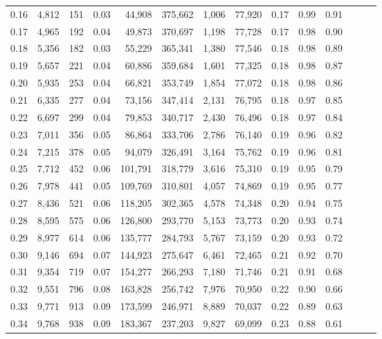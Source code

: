 \begin{tabular}{rrrrrrrrrrrrrr}
0.16 &  4,812 &    151 &  0.03 &   44,908 &  375,662 &   1,006 &  77,920 &  0.17 &  0.99 &      0.91 \\
0.17 &  4,965 &    192 &  0.04 &   49,873 &  370,697 &   1,198 &  77,728 &  0.17 &  0.98 &      0.90 \\
0.18 &  5,356 &    182 &  0.03 &   55,229 &  365,341 &   1,380 &  77,546 &  0.18 &  0.98 &      0.89 \\
0.19 &  5,657 &    221 &  0.04 &   60,886 &  359,684 &   1,601 &  77,325 &  0.18 &  0.98 &      0.87 \\
0.20 &  5,935 &    253 &  0.04 &   66,821 &  353,749 &   1,854 &  77,072 &  0.18 &  0.98 &      0.86 \\
0.21 &  6,335 &    277 &  0.04 &   73,156 &  347,414 &   2,131 &  76,795 &  0.18 &  0.97 &      0.85 \\
0.22 &  6,697 &    299 &  0.04 &   79,853 &  340,717 &   2,430 &  76,496 &  0.18 &  0.97 &      0.84 \\
0.23 &  7,011 &    356 &  0.05 &   86,864 &  333,706 &   2,786 &  76,140 &  0.19 &  0.96 &      0.82 \\
0.24 &  7,215 &    378 &  0.05 &   94,079 &  326,491 &   3,164 &  75,762 &  0.19 &  0.96 &      0.81 \\
0.25 &  7,712 &    452 &  0.06 &  101,791 &  318,779 &   3,616 &  75,310 &  0.19 &  0.95 &      0.79 \\
0.26 &  7,978 &    441 &  0.05 &  109,769 &  310,801 &   4,057 &  74,869 &  0.19 &  0.95 &      0.77 \\
0.27 &  8,436 &    521 &  0.06 &  118,205 &  302,365 &   4,578 &  74,348 &  0.20 &  0.94 &      0.75 \\
0.28 &  8,595 &    575 &  0.06 &  126,800 &  293,770 &   5,153 &  73,773 &  0.20 &  0.93 &      0.74 \\
0.29 &  8,977 &    614 &  0.06 &  135,777 &  284,793 &   5,767 &  73,159 &  0.20 &  0.93 &      0.72 \\
0.30 &  9,146 &    694 &  0.07 &  144,923 &  275,647 &   6,461 &  72,465 &  0.21 &  0.92 &      0.70 \\
0.31 &  9,354 &    719 &  0.07 &  154,277 &  266,293 &   7,180 &  71,746 &  0.21 &  0.91 &      0.68 \\
0.32 &  9,551 &    796 &  0.08 &  163,828 &  256,742 &   7,976 &  70,950 &  0.22 &  0.90 &      0.66 \\
0.33 &  9,771 &    913 &  0.09 &  173,599 &  246,971 &   8,889 &  70,037 &  0.22 &  0.89 &      0.63 \\
0.34 &  9,768 &    938 &  0.09 &  183,367 &  237,203 &   9,827 &  69,099 &  0.23 &  0.88 &      0.61 \\

\end{tabular}
